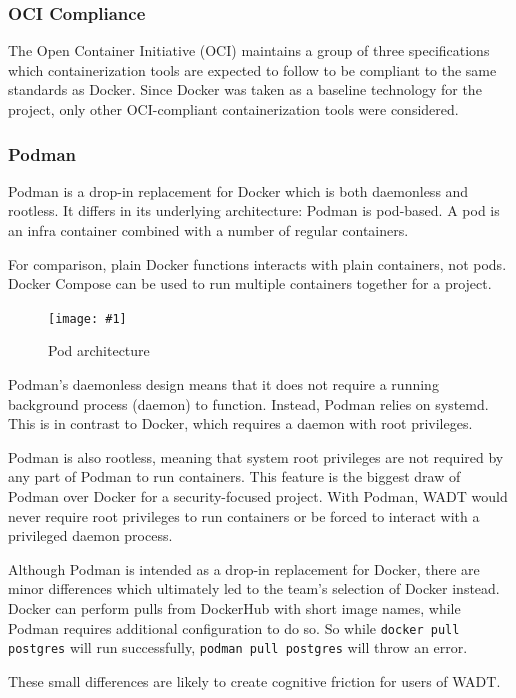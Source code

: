 \documentclass[12pt]{article}
\newcommand{\simplegraphic}[3] {
\begin{figure}[H]
	\centering
	\texttt{[image: \#1]}
	\caption{#2}
	\label{#3}
\end{figure}
}
\begin{document}
\subsubsection{OCI Compliance}
The Open Container Initiative (OCI) maintains a group of three specifications which containerization tools are expected to follow to be compliant to the same standards as Docker. Since Docker was taken as a baseline technology for the project, only other OCI-compliant containerization tools were considered.

\subsubsection{Podman}
Podman is a drop-in replacement for Docker which is both daemonless and rootless. It differs in its underlying architecture: Podman is pod-based. A pod is an infra container combined with a number of regular containers.

For comparison, plain Docker functions interacts with plain containers, not pods. Docker Compose can be used to run multiple containers together for a project.

\simplegraphic{podman-pod-architecture}{Pod architecture}{fig:podman}

Podman's daemonless design means that it does not require a running background process (daemon) to function. Instead, Podman relies on systemd. This is in contrast to Docker, which requires a daemon with root privileges.

Podman is also rootless, meaning that system root privileges are not required by any part of Podman to run containers. This feature is the biggest draw of Podman over Docker for a security-focused project. With Podman, WADT would never require root privileges to run containers or be forced to interact with a privileged daemon process.

Although Podman is intended as a drop-in replacement for Docker, there are minor differences which ultimately led to the team's selection of Docker instead. Docker can perform pulls from DockerHub with short image names, while Podman requires additional configuration to do so. So while \texttt{docker pull postgres} will run successfully, \texttt{podman pull postgres} will throw an error.

These small differences are likely to create cognitive friction for users of WADT.
\end{document}
